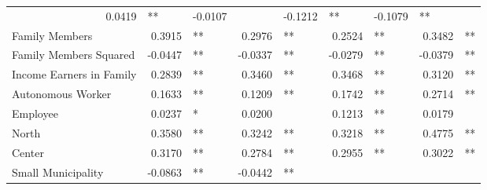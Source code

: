 \documentclass[12pt]{article}
\begin{document}
\begin{table}[!h]
\begin{tabular}{lllllllll}
  \multicolumn{1}{r}{0.0419} &
  \multicolumn{1}{l}{**} &
  \multicolumn{1}{r}{-0.0107} &
  \multicolumn{1}{l}{} &
  \multicolumn{1}{r}{-0.1212} &
  \multicolumn{1}{l}{**} &
  \multicolumn{1}{r}{-0.1079} &
  \multicolumn{1}{l}{**} \\
\multicolumn{1}{l}{Family Members} &
  \multicolumn{1}{r}{0.3915} &
  \multicolumn{1}{l}{**} &
  \multicolumn{1}{r}{0.2976} &
  \multicolumn{1}{l}{**} &
  \multicolumn{1}{r}{0.2524} &
  \multicolumn{1}{l}{**} &
  \multicolumn{1}{r}{0.3482} &
  \multicolumn{1}{l}{**} \\
\multicolumn{1}{l}{Family Members Squared} &
  \multicolumn{1}{r}{-0.0447} &
  \multicolumn{1}{l}{**} &
  \multicolumn{1}{r}{-0.0337} &
  \multicolumn{1}{l}{**} &
  \multicolumn{1}{r}{-0.0279} &
  \multicolumn{1}{l}{**} &
  \multicolumn{1}{r}{-0.0379} &
  \multicolumn{1}{l}{**} \\
\multicolumn{1}{l}{Income Earners in Family} &
  \multicolumn{1}{r}{0.2839} &
  \multicolumn{1}{l}{**} &
  \multicolumn{1}{r}{0.3460} &
  \multicolumn{1}{l}{**} &
  \multicolumn{1}{r}{0.3468} &
  \multicolumn{1}{l}{**} &
  \multicolumn{1}{r}{0.3120} &
  \multicolumn{1}{l}{**} \\
\multicolumn{1}{l}{Autonomous Worker} &
  \multicolumn{1}{r}{0.1633} &
  \multicolumn{1}{l}{**} &
  \multicolumn{1}{r}{0.1209} &
  \multicolumn{1}{l}{**} &
  \multicolumn{1}{r}{0.1742} &
  \multicolumn{1}{l}{**} &
  \multicolumn{1}{r}{0.2714} &
  \multicolumn{1}{l}{**} \\
\multicolumn{1}{l}{Employee} &
  \multicolumn{1}{r}{0.0237} &
  \multicolumn{1}{l}{*} &
  \multicolumn{1}{r}{0.0200} &
  \multicolumn{1}{l}{} &
  \multicolumn{1}{r}{0.1213} &
  \multicolumn{1}{l}{**} &
  \multicolumn{1}{r}{0.0179} &
  \multicolumn{1}{l}{} \\
\multicolumn{1}{l}{North} &
  \multicolumn{1}{r}{0.3580} &
  \multicolumn{1}{l}{**} &
  \multicolumn{1}{r}{0.3242} &
  \multicolumn{1}{l}{**} &
  \multicolumn{1}{r}{0.3218} &
  \multicolumn{1}{l}{**} &
  \multicolumn{1}{r}{0.4775} &
  \multicolumn{1}{l}{**} \\
\multicolumn{1}{l}{Center} &
  \multicolumn{1}{r}{0.3170} &
  \multicolumn{1}{l}{**} &
  \multicolumn{1}{r}{0.2784} &
  \multicolumn{1}{l}{**} &
  \multicolumn{1}{r}{0.2955} &
  \multicolumn{1}{l}{**} &
  \multicolumn{1}{r}{0.3022} &
  \multicolumn{1}{l}{**} \\
\multicolumn{1}{l}{Small Municipality} &
  \multicolumn{1}{r}{-0.0863} &
  \multicolumn{1}{l}{**} &
  \multicolumn{1}{r}{-0.0442} &
  \multicolumn{1}{l}{**} &

\end{tabular}
\end{table}
\end{document}
